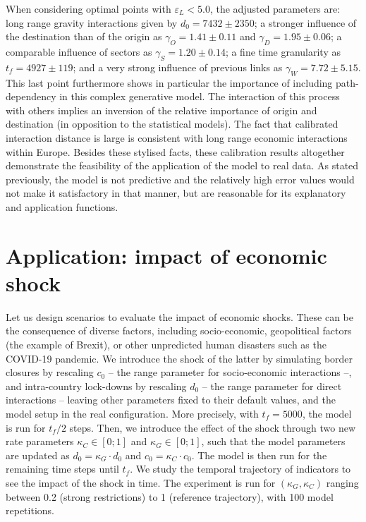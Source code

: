\documentclass[10pt,letterpaper]{article}
\begin{document}
When considering optimal points with $\varepsilon_L < 5.0$, the adjusted parameters are: long range gravity interactions given by $d_0 = 7432 \pm 2350$; a stronger influence of the destination than of the origin as $\gamma_O = 1.41 \pm 0.11$ and $\gamma_D = 1.95 \pm 0.06$; a comparable influence of sectors as $\gamma_S = 1.20 \pm 0.14$; a fine time granularity as $t_f = 4927 \pm 119$; and a very strong influence of previous links as $\gamma_W = 7.72 \pm 5.15$. This last point furthermore shows in particular the importance of including path-dependency in this complex generative model. The interaction of this process with others implies an inversion of the relative importance of origin and destination (in opposition to the statistical models). The fact that calibrated interaction distance is large is consistent with long range economic interactions within Europe. Besides these stylised facts, these calibration results altogether demonstrate the feasibility of the application of the model to real data. As stated previously, the model is not predictive and the relatively high error values would not make it satisfactory in that manner, but are reasonable for its explanatory and application functions.


\section*{Application: impact of economic shock}

Let us design scenarios to evaluate the impact of economic shocks. These can be the consequence of diverse factors, including socio-economic, geopolitical factors (the example of Brexit), or other unpredicted human disasters such as the COVID-19 pandemic. We introduce the shock of the latter by simulating border closures by rescaling $c_0$ -- the range parameter for socio-economic interactions --, and intra-country lock-downs by rescaling $d_0$ -- the range parameter for direct interactions -- leaving other parameters fixed to their default values, and the model setup in the real configuration. More precisely, with $t_f = 5000$, the model is run for $t_f / 2$ steps. Then, we introduce the effect of the shock through two new rate parameters $\kappa_C \in \left[0;1\right]$ and $\kappa_G \in \left[0;1\right]$, such that the model parameters are updated as $d_0 = \kappa_G \cdot d_0$ and $c_0 = \kappa_C \cdot c_0$. The model is then run for the remaining time steps until $t_f$. We study the temporal trajectory of indicators to see the impact of the shock in time. The experiment is run for $(\kappa_G,\kappa_C)$ ranging between 0.2 (strong restrictions) to 1 (reference trajectory), with 100 model repetitions.
\end{document}
